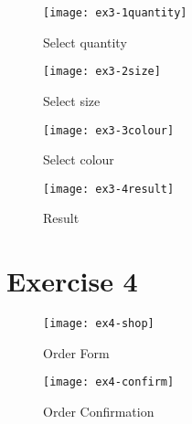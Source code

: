 \clearpage
\captionsetup{type=figure}


\clearpage
\captionsetup{type=figure}


\captionsetup{type=figure}


\begin{figure}[H]
  \caption{Select quantity}
  \centering
  \texttt{[image: ex3-1quantity]}
\end{figure}

\begin{figure}[H]
  \caption{Select size}
  \centering
  \texttt{[image: ex3-2size]}
\end{figure}

\begin{figure}[H]
  \caption{Select colour}
  \centering
  \texttt{[image: ex3-3colour]}
\end{figure}

\begin{figure}[H]
  \caption{Result}
  \centering
  \texttt{[image: ex3-4result]}
\end{figure}

\clearpage
\section{Exercise 4}

\begin{figure}[H]
  \caption{Order Form}
  \centering
  \texttt{[image: ex4-shop]}
\end{figure}

\begin{figure}[H]
  \caption{Order Confirmation}
  \centering
  \texttt{[image: ex4-confirm]}
\end{figure}
